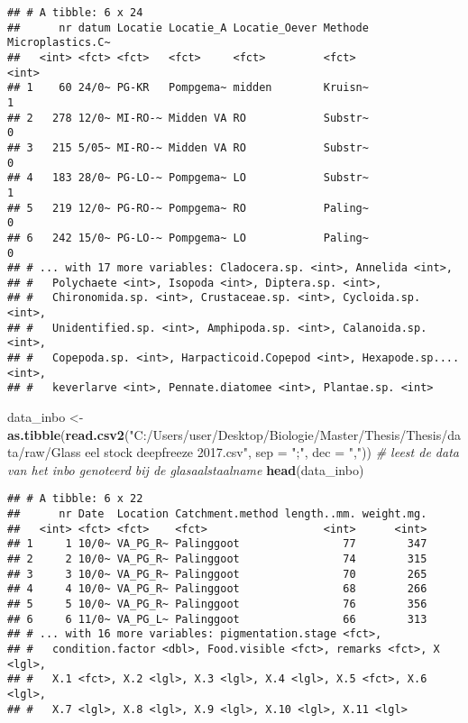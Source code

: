 \documentclass[]{article}
\newenvironment{Shaded}{\begin{snugshade}}{\end{snugshade}}
\newcommand{\KeywordTok}[1]{\textcolor[rgb]{0.13,0.29,0.53}{\textbf{#1}}}
\newcommand{\DataTypeTok}[1]{\textcolor[rgb]{0.13,0.29,0.53}{#1}}
\newcommand{\StringTok}[1]{\textcolor[rgb]{0.31,0.60,0.02}{#1}}
\newcommand{\CommentTok}[1]{\textcolor[rgb]{0.56,0.35,0.01}{\textit{#1}}}
\newcommand{\NormalTok}[1]{#1}
\begin{document}
\begin{verbatim}
## # A tibble: 6 x 24
##      nr datum Locatie Locatie_A Locatie_Oever Methode Microplastics.C~
##   <int> <fct> <fct>   <fct>     <fct>         <fct>              <int>
## 1    60 24/0~ PG-KR   Pompgema~ midden        Kruisn~                1
## 2   278 12/0~ MI-RO-~ Midden VA RO            Substr~                0
## 3   215 5/05~ MI-RO-~ Midden VA RO            Substr~                0
## 4   183 28/0~ PG-LO-~ Pompgema~ LO            Substr~                1
## 5   219 12/0~ PG-RO-~ Pompgema~ RO            Paling~                0
## 6   242 15/0~ PG-LO-~ Pompgema~ LO            Paling~                0
## # ... with 17 more variables: Cladocera.sp. <int>, Annelida <int>,
## #   Polychaete <int>, Isopoda <int>, Diptera.sp. <int>,
## #   Chironomida.sp. <int>, Crustaceae.sp. <int>, Cycloida.sp. <int>,
## #   Unidentified.sp. <int>, Amphipoda.sp. <int>, Calanoida.sp. <int>,
## #   Copepoda.sp. <int>, Harpacticoid.Copepod <int>, Hexapode.sp.... <int>,
## #   keverlarve <int>, Pennate.diatomee <int>, Plantae.sp. <int>
\end{verbatim}

\begin{Shaded}
\begin{Highlighting}[]
\NormalTok{data_inbo <-}\StringTok{ }\KeywordTok{as.tibble}\NormalTok{(}\KeywordTok{read.csv2}\NormalTok{(}\StringTok{"C:/Users/user/Desktop/Biologie/Master/Thesis/Thesis/data/raw/Glass eel stock deepfreeze 2017.csv"}\NormalTok{, }\DataTypeTok{sep =} \StringTok{";"}\NormalTok{, }\DataTypeTok{dec =} \StringTok{","}\NormalTok{)) }\CommentTok{# leest de data van het inbo genoteerd bij de glasaalstaalname}
\KeywordTok{head}\NormalTok{(data_inbo)}
\end{Highlighting}
\end{Shaded}

\begin{verbatim}
## # A tibble: 6 x 22
##      nr Date  Location Catchment.method length..mm. weight.mg.
##   <int> <fct> <fct>    <fct>                  <int>      <int>
## 1     1 10/0~ VA_PG_R~ Palinggoot                77        347
## 2     2 10/0~ VA_PG_R~ Palinggoot                74        315
## 3     3 10/0~ VA_PG_R~ Palinggoot                70        265
## 4     4 10/0~ VA_PG_R~ Palinggoot                68        266
## 5     5 10/0~ VA_PG_R~ Palinggoot                76        356
## 6     6 11/0~ VA_PG_L~ Palinggoot                66        313
## # ... with 16 more variables: pigmentation.stage <fct>,
## #   condition.factor <dbl>, Food.visible <fct>, remarks <fct>, X <lgl>,
## #   X.1 <fct>, X.2 <lgl>, X.3 <lgl>, X.4 <lgl>, X.5 <fct>, X.6 <lgl>,
## #   X.7 <lgl>, X.8 <lgl>, X.9 <lgl>, X.10 <lgl>, X.11 <lgl>
\end{verbatim}
\end{document}
